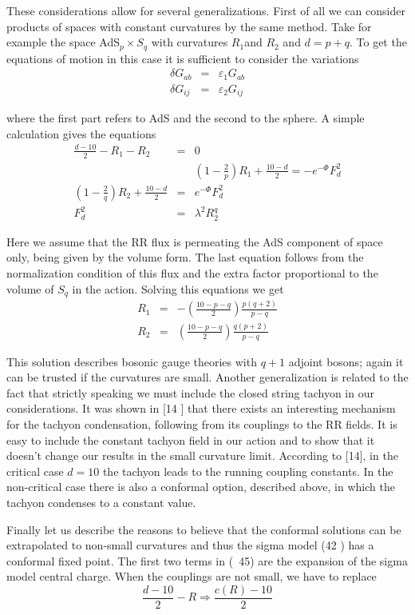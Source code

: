 \documentclass[a4paper,12pt]{article}
\begin{document}
These considerations allow for several generalizations. First of all we can
consider products of spaces with constant curvatures by the same method.
Take for example the space AdS$_{p}\times S_{q}$ with curvatures $R_{1}$and $%
R_{2}$ and $d=p+q$. To get the equations of motion in this case it is
sufficient to consider the variations 
\begin{eqnarray}
\delta G_{ab} &=&\varepsilon _{1}G_{ab} \\
\delta G_{ij} &=&\varepsilon _{2}G_{ij}
\end{eqnarray}

where the first part refers to AdS and the second to the sphere. A simple
calculation gives the equations 
\begin{eqnarray}
\frac{d-10}{2}-R_{1}-R_{2} &=&0 \\
&&(1-\frac{2}{p})R_{1}+\frac{10-d}{2}=-e^{-\Phi }F_{d}^{2} \\
(1-\frac{2}{q})R_{2}+\frac{10-d}{2} &=&e^{-\Phi }F_{d}^{2} \\
F_{d}^{2} &=&\lambda ^{2}R_{2}^{q}
\end{eqnarray}

Here we assume that the RR flux is permeating the AdS component of space
only, being given by the volume form. The last equation follows from the
normalization condition of this flux and the extra factor proportional to
the volume of $S_{q}$ in the action. Solving this equations we get 
\begin{eqnarray}
R_{1} &=&-(\frac{10-p-q}{2})\frac{p(q+2)}{p-q} \\
R_{2} &=&(\frac{10-p-q}{2})\frac{q(p+2)}{p-q}
\end{eqnarray}

This solution describes bosonic gauge theories with $q+1$ adjoint bosons;
again it can be trusted if the curvatures are small. Another generalization
is related to the fact that strictly speaking we must include the closed
string tachyon in our considerations. It was shown in [14 ] that there
exists an interesting mechanism for the tachyon condensation, following from
its couplings to the RR fields. It is easy to include the constant tachyon
field in our action and to show that it doesn't change our results in the
small curvature limit. According to [14], in the critical case $d=10$ the
tachyon leads to the running coupling constants. In the non-critical case
there is also a conformal option, described above, in which the tachyon
condenses to a constant value.

Finally let us describe the reasons to believe that the conformal solutions
can be extrapolated to non-small curvatures and thus the sigma model (42 )
has a conformal fixed point. The first two terms in (\ 45) are the expansion
of the sigma model central charge. When the couplings are not small, we have
to replace 
\begin{equation}
\frac{d-10}{2}-R\Rightarrow \frac{c(R)-10}{2}
\end{equation}
\end{document}
